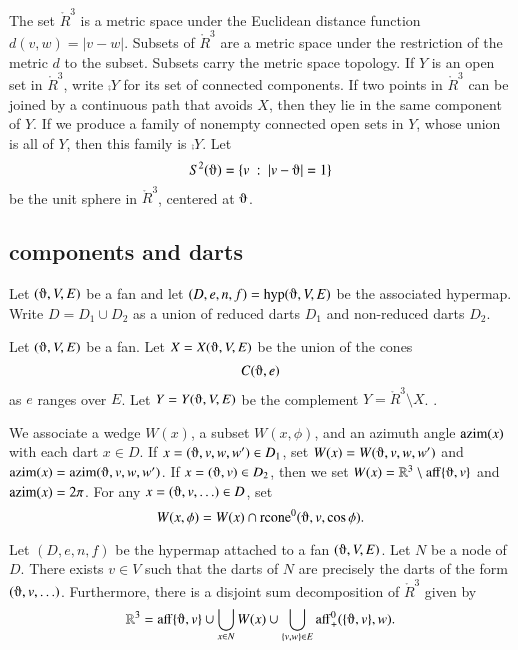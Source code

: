 The set $\ring{R}^3$ is a metric space under the
Euclidean distance function $d(v,w) = |v-w|$.  Subsets of
$\ring{R}^3$ are a metric space under the restriction of the metric
$d$ to the subset. Subsets carry the metric space topology. 
If $Y$ is an open set in $\ring{R}^3$, write
$\comp{Y}$ for its set of connected components.
If two
points in $\ring{R}^3$ 
can be joined by a continuous path that avoids $X$,
then they lie in the same component of $Y$.
If we produce a family of nonempty connected open sets in
$Y$, whose union is all of $Y$, then
this family is $\comp{Y}$.
Let $$S^2(\orgn) = \{ v \mid | v-\orgn | = 1\}$$ be the unit sphere in
$\ring{R}^3$, centered at $\orgn$.  






\subsection{components and darts}

Let $(\orgn,V,E)$ be a fan and let $(D,e,n,f) = \op{hyp}(\orgn,V,E)$
be the associated hypermap.  Write $D = D_1\cup D_2$ as a union of
reduced darts $D_1$ and non-reduced darts $D_2$.

\begin{definition}\label{def:XY}
Let $(\orgn,V,E)$ be a fan.  Let $X=X(\orgn,V,E)$ be the union of the
cones
   $$C(\orgn,e)$$
as $e$ ranges over $E$.  Let $Y=Y(\orgn,V,E)$ be the complement
$Y = \ring{R}^3\setminus X$.
.
\end{definition}


We associate a wedge $W(x)$, a subset $W(x,\phi)$,
and an azimuth angle ${\operatorname{azim}}(x)$
with each dart $x\in D$.  If
$x=(\orgn,v,w,w')\in D_1$, set
$W(x) = W(\orgn,v,w,w')$ and $\op{azim}(x) =
\op{azim}(\orgn,v,w,w')$.   If $x=(\orgn,v)\in D_2$, then we set
$W(x) = \ring{R}^3\setminus \op{aff}\{\orgn,v\}$ and ${\operatorname{azim}}(x) = 2\pi$.  For any $x = (\orgn,v,\ldots)\in D$, set
    $$
    W(x,\phi) = W(x) \cap \op{rcone}^0(\orgn,v,\cos\phi).
    $$


\begin{lemma}  
Let $(D,e,n,f)$ be the hypermap attached to a 
fan $(\orgn,V,E)$.
Let $N$ be a node of $D$.  There exists $v\in V$
such that the darts of $N$ are precisely
the darts of the form $(\orgn,v,\ldots)$.  Furthermore, there is a 
disjoint sum decomposition of $\ring{R}^3$ given by
  $$
  \ring{R}^3 = 
  \op{aff}\{\orgn,v\} \cup
  \bigcup_{x\in N} W(x)  \cup 
  \bigcup_{\{v,w\}\in E} \op{aff}_+^0(\{\orgn,v\},w).
  $$
\end{lemma}


